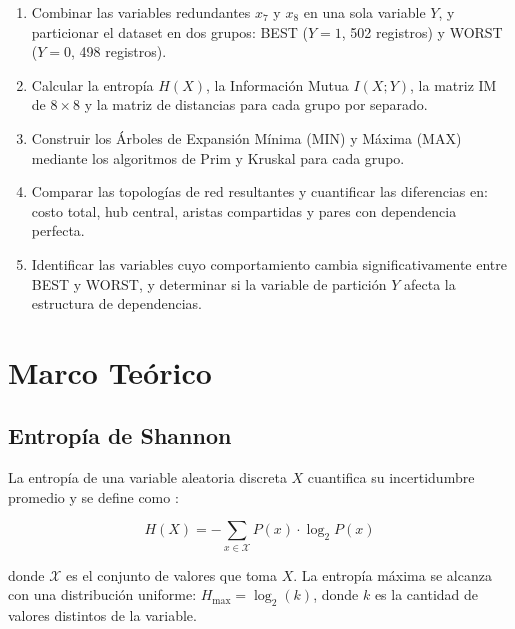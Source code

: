 \documentclass[12pt, a4paper]{article}
\begin{document}
\begin{enumerate}
    \item Combinar las variables redundantes $x_7$ y $x_8$ en una sola
          variable $Y$, y particionar el dataset en dos grupos:
          BEST ($Y = 1$, 502 registros) y WORST ($Y = 0$, 498 registros).

    \item Calcular la entropía $H(X)$, la Información Mutua
          $I(X;Y)$, la matriz IM de $8 \times 8$ y la matriz de
          distancias para cada grupo por separado.

    \item Construir los Árboles de Expansión Mínima (MIN) y
          Máxima (MAX) mediante los algoritmos de Prim y Kruskal
          para cada grupo.

    \item Comparar las topologías de red resultantes y cuantificar
          las diferencias en: costo total, hub central, aristas
          compartidas y pares con dependencia perfecta.

    \item Identificar las variables cuyo comportamiento cambia
          significativamente entre BEST y WORST, y determinar si la
          variable de partición $Y$ afecta la estructura de
          dependencias.
\end{enumerate}

\section{Marco Teórico}

\subsection{Entropía de Shannon}

La entropía de una variable aleatoria discreta $X$ cuantifica su
incertidumbre promedio y se define como \cite{shannon1948}:

\begin{equation}\label{eq:entropy}
    H(X) = -\sum_{x \in \mathcal{X}} P(x) \cdot \log_2 P(x)
\end{equation}

donde $\mathcal{X}$ es el conjunto de valores que toma $X$. La entropía
máxima se alcanza con una distribución uniforme: $H_{\max} = \log_2(k)$,
donde $k$ es la cantidad de valores distintos de la variable.
\end{document}
